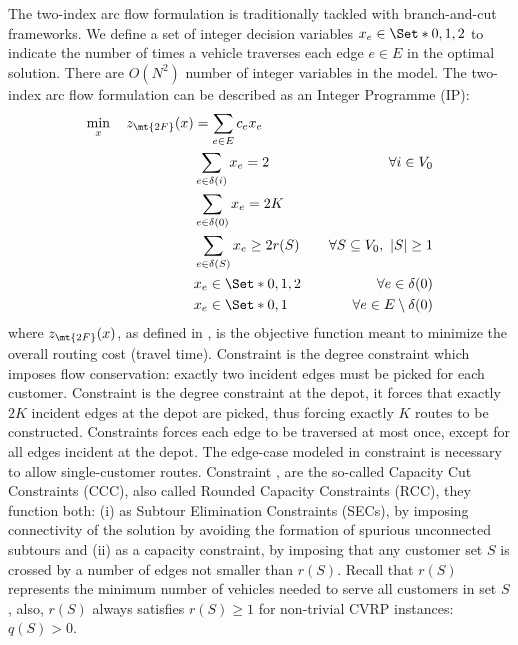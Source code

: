 The two-index arc flow formulation is traditionally tackled with branch-and-cut frameworks.
We define a set of integer decision variables $x_e \in \Set*{0, 1, 2}$ to indicate the number of times
a vehicle traverses each edge $e \in E$ in the optimal solution.
There are $O(N^2)$ number of integer variables in the model.
The two-index arc flow formulation can be described as an Integer Programme (IP):
\begin{align}
	\min_{x} \quad z_\mt{2F}(x) & = \sum_{e \in E} c_e x_e                 & \label{eq:two-index-flow-obj-func}                                                   \\
	                            & \sum_{e \in \delta(i)} x_e = 2           & \quad \forall i \in V_0 \label{eq:two-index-flow-two-edges-incident-per-customer}    \\
	                            & \sum_{e \in \delta(0)} x_e = 2 K         & \label{eq:two-index-flow-two-k-edges-incident-in-the-depot-node}                     \\
	                            & \sum_{e \in \delta(S)} x_e \ge 2 r(S)    & \quad \forall S \subseteq V_0,\ |S| \ge 1 \label{eq:two-index-flow-ccc}              \\
	                            & x_e                   \in \Set*{0, 1, 2} & \quad \forall e \in \delta(0) \label{eq:two-index-flow-x-mip-var-bounds-depot}       \\
	                            & x_e                   \in \Set*{0, 1}    & \quad \forall e \in E \setminus \delta(0) \label{eq:two-index-flow-x-mip-var-bounds}
\end{align}
where $z_\mt{2F}(x)$, as defined in , is the objective function meant to minimize the overall routing cost (travel time).
Constraint  is the degree constraint which imposes flow conservation: exactly two incident edges must be picked for each customer.
Constraint  is the degree constraint at the depot, it forces that exactly $2K$ incident edges at the depot are picked, thus forcing exactly $K$ routes to be constructed.
Constraints  forces each edge to be traversed at most once,
except for all edges incident at the depot.
The edge-case modeled in constraint  is necessary to allow single-customer routes.
Constraint , are the so-called Capacity Cut Constraints (CCC), also called Rounded Capacity Constraints (RCC), they function both:
(i) as Subtour Elimination Constraints (SECs),
by imposing connectivity of the solution by avoiding the formation of spurious unconnected subtours
and (ii) as a capacity constraint,
by imposing that any customer set $S$ is crossed by a number of edges not smaller than $r(S)$.
Recall that $r(S)$ represents the minimum number of vehicles needed to serve all customers in set $S$,
also, $r(S)$ always satisfies $r(S) \ge 1$ for non-trivial CVRP instances: $q(S) > 0$.

